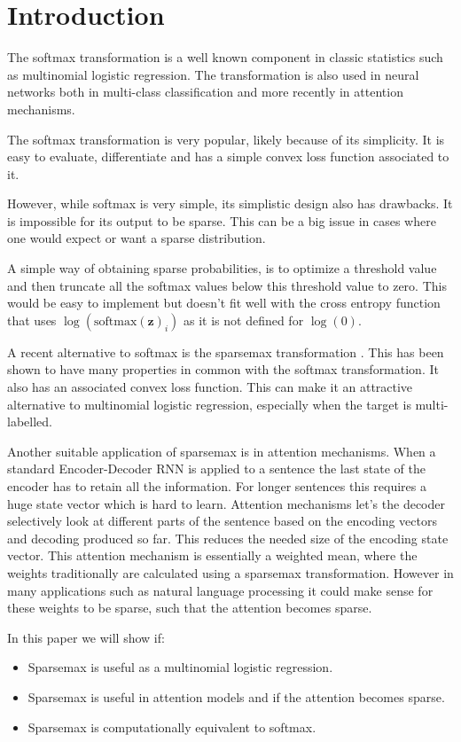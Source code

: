 \section{Introduction}

The softmax transformation is a well known component in classic statistics such as multinomial logistic regression. The transformation is also used in neural networks both in multi-class classification and more recently in attention mechanisms.

The softmax transformation is very popular, likely because of its simplicity. It is easy to evaluate, differentiate and has a simple convex loss function associated to it.

However, while softmax is very simple, its simplistic design also has drawbacks. It is impossible for its output to be sparse. This can be a big issue in cases where one would expect or want a sparse distribution.

A simple way of obtaining sparse probabilities, is to optimize a threshold value and then truncate all the softmax values below this threshold value to zero. This would be easy to implement but doesn't fit well with the cross entropy function that uses $\log(\mathrm{softmax}(\mathbf{z})_i)$ as it is not defined for $\log(0)$.

A recent alternative to softmax is the sparsemax transformation \cite{sparsemax}. This has been shown to have many properties in common with the softmax transformation. It also has an associated convex loss function. This can make it an attractive alternative to multinomial logistic regression, especially when the target is multi-labelled.

Another suitable application of sparsemax is in attention mechanisms. When a standard Encoder-Decoder RNN is applied to a sentence the last state of the encoder has to retain all the information. For longer sentences this requires a huge state vector which is hard to learn. Attention mechanisms let's the decoder selectively look at different parts of the sentence based on the encoding vectors and decoding produced so far. This reduces the needed size of the encoding state vector. This attention mechanism is essentially a weighted mean, where the weights traditionally are calculated using a sparsemax transformation. However in many applications such as natural language processing it could make sense for these weights to be sparse, such that the attention becomes sparse.

In this paper we will show if:
\begin{itemize}
\setlength\itemsep{-0.3em}
\item Sparsemax is useful as a multinomial logistic regression.
\item Sparsemax is useful in attention models and if the attention becomes sparse.
\item Sparsemax is computationally equivalent to softmax.
\end{itemize}
